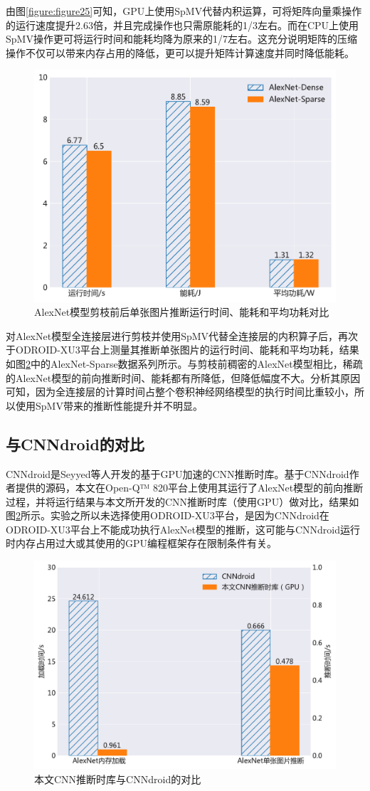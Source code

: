 由图\ref{figure:figure25}可知，GPU上使用SpMV代替内积运算，可将矩阵向量乘操作的运行速度提升2.63倍，并且完成操作也只需原能耗的1/3左右。而在CPU上使用SpMV操作更可将运行时间和能耗均降为原来的1/7左右。这充分说明矩阵的压缩操作不仅可以带来内存占用的降低，更可以提升矩阵计算速度并同时降低能耗。


\begin{figure}[htbp]
    \centering
    \includegraphics[height=0.4\textwidth]{figures/alexnet_sparse.pdf}
    \caption{AlexNet模型剪枝前后单张图片推断运行时间、能耗和平均功耗对比}\label{figure:figure26}
\end{figure}

对AlexNet模型全连接层进行剪枝并使用SpMV代替全连接层的内积算子后，再次于ODROID-XU3平台上测量其推断单张图片的运行时间、能耗和平均功耗，结果如图\ref{figure:figure26}中的AlexNet-Sparse数据系列所示。与剪枝前稠密的AlexNet模型相比，稀疏的AlexNet模型的前向推断时间、能耗都有所降低，但降低幅度不大。分析其原因可知，因为全连接层的计算时间占整个卷积神经网络模型的执行时间比重较小，所以使用SpMV带来的推断性能提升并不明显。

\subsection{与CNNdroid的对比}

CNNdroid\cite{latifi2016cnndroid}是Seyyed等人开发的基于GPU加速的CNN推断时库。基于CNNdroid作者提供的源码，本文在Open-Q™ 820平台上使用其运行了AlexNet模型的前向推断过程，并将运行结果与本文所开发的CNN推断时库（使用GPU）做对比，结果如图\ref{figure:figure26}所示。实验之所以未选择使用ODROID-XU3平台，是因为CNNdroid在ODROID-XU3平台上不能成功执行AlexNet模型的推断，这可能与CNNdroid运行时内存占用过大或其使用的GPU编程框架存在限制条件有关。

\begin{figure}[htbp]
    \centering
    \includegraphics[height=0.44\textwidth]{figures/cnndroid.pdf}
    \caption{本文CNN推断时库与CNNdroid的对比}\label{figure:figure26}
\end{figure}


